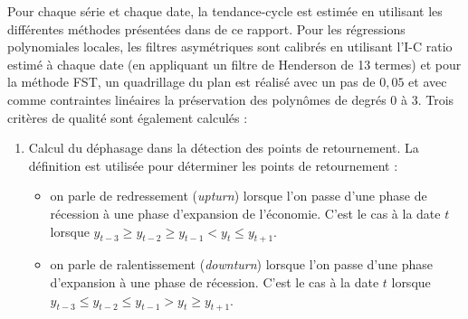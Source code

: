 \documentclass[
  12pt,
  french,
  12pt,a4paper]{article}
\providecommand{\tightlist}{%
  \setlength{\itemsep}{0pt}\setlength{\parskip}{0pt}}
\newcommand\1{\mathds{1}}
\begin{document}
Pour chaque série et chaque date, la tendance-cycle est estimée en utilisant les différentes méthodes présentées dans de ce rapport.
Pour les régressions polynomiales locales, les filtres asymétriques sont calibrés en utilisant l'I-C ratio estimé à chaque date (en appliquant un filtre de Henderson de 13 termes) et pour la méthode FST, un quadrillage du plan est réalisé avec un pas de \(0,05\) et avec comme contraintes linéaires la préservation des polynômes de degrés 0 à 3.
Trois critères de qualité sont également calculés :

\begin{enumerate}
\def\labelenumi{\arabic{enumi}.}
\item
  Calcul du déphasage dans la détection des points de retournement. La définition \textcite{Zellner1991} est utilisée pour déterminer les points de retournement :

  \begin{itemize}
  \tightlist
  \item
    on parle de redressement (\emph{upturn}) lorsque l'on passe d'une phase de récession à une phase d'expansion de l'économie.
    C'est le cas à la date \(t\) lorsque \(y_{t-3}\geq y_{t-2}\geq y_{t-1}<y_t\leq y_{t+1}\).\\
  \item
    on parle de ralentissement (\emph{downturn}) lorsque l'on passe d'une phase d'expansion à une phase de récession.
    C'est le cas à la date \(t\) lorsque \(y_{t-3}\leq y_{t-2}\leq y_{t-1}>y_t\geq y_{t+1}\).
  \end{itemize}


\end{enumerate}
\end{document}
